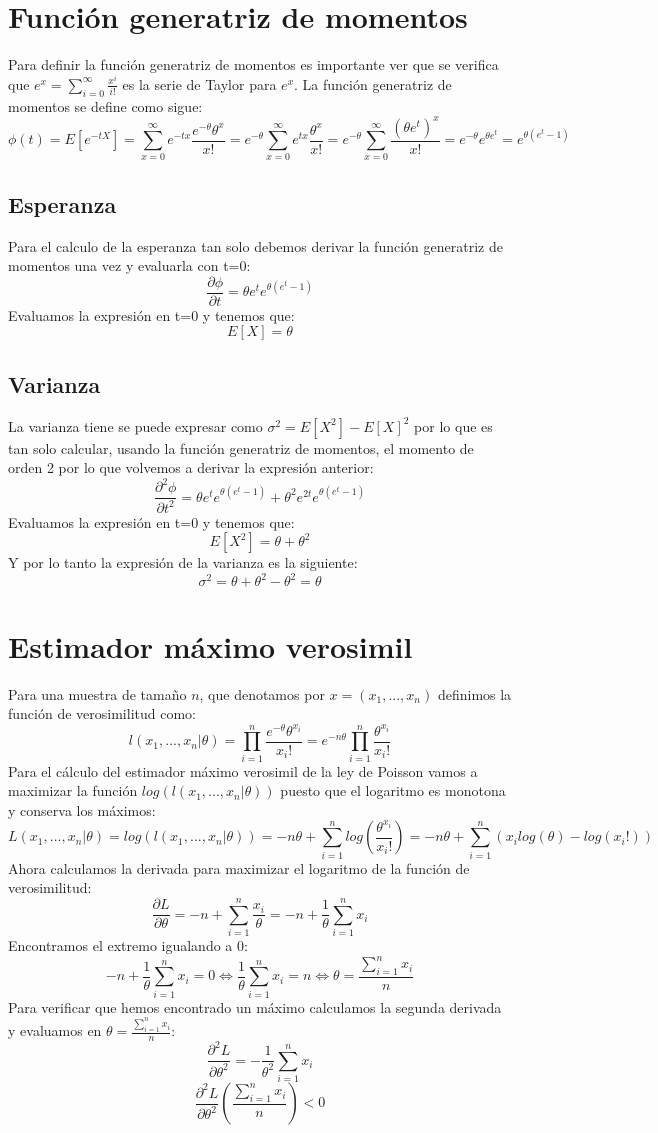 \documentclass[a4paper, 10pt]{article} %
\newcounter{def}
\begin{document}
\section{Función generatriz de momentos}
Para definir la función generatriz de momentos es importante ver que se verifica que $e^x=\sum_{i=0}^{\infty}\frac{x^i}{i!}$ es la serie de Taylor para $e^x$.
La función generatriz de momentos se define como sigue:
$$\phi(t)=E[e^{-tX}]=\sum_{x=0}^{\infty}e^{-t x}\frac{e^{-\theta}\theta^x}{x!}=e^{-\theta}\sum_{x=0}^{\infty}e^{t x}\frac{\theta^x}{x!}=e^{-\theta}\sum_{x=0}^{\infty}\frac{(\theta e^t)^x}{x!}=e^{-\theta}e^{\theta e^t}=e^{\theta(e^t-1)}$$
\subsection{Esperanza}
Para el calculo de la esperanza tan solo debemos derivar la función generatriz de momentos una vez y evaluarla con t=0:
$$\frac{\partial\phi}{\partial t} = \theta e^t e^{\theta(e^t-1)}$$
Evaluamos la expresión en t=0 y tenemos que:
$$E[X]=\theta$$
\subsection{Varianza}
La varianza tiene se puede expresar como $\sigma^2=E[X^2]-E[X]^2$ por lo que es tan solo calcular, usando la función generatriz de momentos, el momento de orden 2 por lo que volvemos a derivar la expresión anterior:
$$\frac{\partial^2\phi}{\partial t^2} = \theta e^t e^{\theta(e^t-1)}+\theta^2 e^{2t} e^{\theta(e^t-1)}$$
Evaluamos la expresión en t=0 y tenemos que:
$$E[X^2]=\theta+\theta^2$$
Y por lo tanto la expresión de la varianza es la siguiente:
$$\sigma^2=\theta+\theta^2-\theta^2=\theta$$
\section{Estimador máximo verosimil}
Para una muestra de tamaño $n$, que denotamos por $x=(x_1,...,x_n)$ definimos la función de verosimilitud como:
$$l(x_1,...,x_n|\theta)=\prod_{i=1}^{n} \frac{e^{-\theta}\theta^{x_i}}{x_i!}=e^{-n\theta}\prod_{i=1}^{n} \frac{\theta^{x_i}}{x_i!}$$
Para el cálculo del estimador máximo verosimil de la ley de Poisson vamos a maximizar la función $log(l(x_1,...,x_n|\theta))$ puesto que el logaritmo es monotona y conserva los máximos:
$$L(x_1,...,x_n|\theta)=log(l(x_1,...,x_n|\theta))=-n\theta + \sum_{i=1}^{n}log(\frac{\theta^{x_i}}{x_i!})=-n\theta+ \sum_{i=1}^{n}(x_i log(\theta)-log(x_i!))$$
Ahora calculamos la derivada para maximizar el logaritmo de la función de verosimilitud:
$$\frac{\partial L}{\partial \theta}=-n+\sum_{i=1}^{n}\frac{x_i}{\theta}=-n+\frac{1}{\theta}\sum_{i=1}^{n}x_i$$
Encontramos el extremo igualando a 0:
$$-n+\frac{1}{\theta}\sum_{i=1}^{n}x_i=0 \Leftrightarrow \frac{1}{\theta}\sum_{i=1}^{n}x_i=n \Leftrightarrow \theta =\frac{\sum_{i=1}^{n}x_i}{n}$$
Para verificar que hemos encontrado un máximo calculamos la segunda derivada y evaluamos en $\theta =\frac{\sum_{i=1}^{n}x_i}{n}$:
$$\frac{\partial^2 L}{\partial \theta^2}=-\frac{1}{\theta^2}\sum_{i=1}^{n}x_i$$
$$\frac{\partial^2 L}{\partial \theta^2}(\frac{\sum_{i=1}^{n}x_i}{n})<0$$
\end{document}
